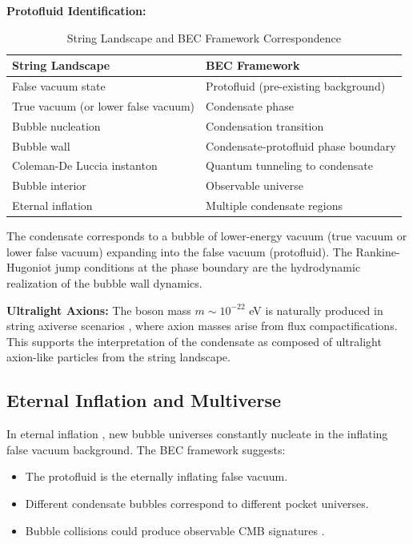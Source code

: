 \documentclass[11pt,a4paper]{article}
\theoremstyle{definition}
\theoremstyle{remark}
\begin{document}
\textbf{Protofluid Identification:}

\begin{table}[H]
\centering
\caption{String Landscape and BEC Framework Correspondence}
\label{tab:string_bec}
\begin{tabular}{@{}ll@{}}
\toprule
\textbf{String Landscape} & \textbf{BEC Framework} \\
\midrule
False vacuum state & Protofluid (pre-existing background) \\
True vacuum (or lower false vacuum) & Condensate phase \\
Bubble nucleation & Condensation transition \\
Bubble wall & Condensate-protofluid phase boundary \\
Coleman-De Luccia instanton & Quantum tunneling to condensate \\
Bubble interior & Observable universe \\
Eternal inflation & Multiple condensate regions \\
\bottomrule
\end{tabular}
\end{table}

The condensate corresponds to a bubble of lower-energy vacuum (true vacuum or lower false vacuum) expanding into the false vacuum (protofluid). The Rankine-Hugoniot jump conditions at the phase boundary are the hydrodynamic realization of the bubble wall dynamics.

\textbf{Ultralight Axions:} The boson mass $m \sim 10^{-22}$ eV is naturally produced in string axiverse scenarios \cite{Arvanitaki2010,Marsh2016}, where axion masses arise from flux compactifications. This supports the interpretation of the condensate as composed of ultralight axion-like particles from the string landscape.

\subsection{Eternal Inflation and Multiverse}
\label{sec:eternal_inflation}

In eternal inflation \cite{Vilenkin1983,Linde1986}, new bubble universes constantly nucleate in the inflating false vacuum background. The BEC framework suggests:
\begin{itemize}
\item The protofluid is the eternally inflating false vacuum.
\item Different condensate bubbles correspond to different pocket universes.
\item Bubble collisions could produce observable CMB signatures \cite{Feeney2011}.
\end{itemize}
\end{document}
